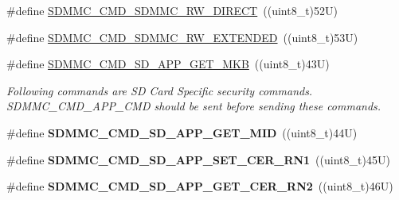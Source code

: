 \begin{DoxyCompactItemize}
\item 
\#define \mbox{\hyperlink{group___s_d_m_m_c___l_l___exported___constants_ga520defb88f2bc2fe1158ec87c6015164}{S\+D\+M\+M\+C\+\_\+\+C\+M\+D\+\_\+\+S\+D\+M\+M\+C\+\_\+\+R\+W\+\_\+\+D\+I\+R\+E\+CT}}~((uint8\+\_\+t)52\+U)
\item 
\#define \mbox{\hyperlink{group___s_d_m_m_c___l_l___exported___constants_ga585faee11fb2b1ab72216550b6c3ab83}{S\+D\+M\+M\+C\+\_\+\+C\+M\+D\+\_\+\+S\+D\+M\+M\+C\+\_\+\+R\+W\+\_\+\+E\+X\+T\+E\+N\+D\+ED}}~((uint8\+\_\+t)53\+U)
\item 
\mbox{\label{group___s_d_m_m_c___l_l___exported___constants_gac0070fb5ad86639410a4ad79c9da32b9}} 
\#define \mbox{\hyperlink{group___s_d_m_m_c___l_l___exported___constants_gac0070fb5ad86639410a4ad79c9da32b9}{S\+D\+M\+M\+C\+\_\+\+C\+M\+D\+\_\+\+S\+D\+\_\+\+A\+P\+P\+\_\+\+G\+E\+T\+\_\+\+M\+KB}}~((uint8\+\_\+t)43\+U)
\begin{DoxyCompactList}\small\item\em Following commands are SD Card Specific security commands. S\+D\+M\+M\+C\+\_\+\+C\+M\+D\+\_\+\+A\+P\+P\+\_\+\+C\+MD should be sent before sending these commands. \end{DoxyCompactList}\item 
\mbox{\label{group___s_d_m_m_c___l_l___exported___constants_gaa17f45a31366e47b44eff6e33982731e}} 
\#define {\bfseries S\+D\+M\+M\+C\+\_\+\+C\+M\+D\+\_\+\+S\+D\+\_\+\+A\+P\+P\+\_\+\+G\+E\+T\+\_\+\+M\+ID}~((uint8\+\_\+t)44\+U)
\item 
\mbox{\label{group___s_d_m_m_c___l_l___exported___constants_ga14ffceb4df0f9c9c67c678eb7d58bc4e}} 
\#define {\bfseries S\+D\+M\+M\+C\+\_\+\+C\+M\+D\+\_\+\+S\+D\+\_\+\+A\+P\+P\+\_\+\+S\+E\+T\+\_\+\+C\+E\+R\+\_\+\+R\+N1}~((uint8\+\_\+t)45\+U)
\item 
\mbox{\label{group___s_d_m_m_c___l_l___exported___constants_gaca35a469acc79c78813cc69fa8f3d89e}} 
\#define {\bfseries S\+D\+M\+M\+C\+\_\+\+C\+M\+D\+\_\+\+S\+D\+\_\+\+A\+P\+P\+\_\+\+G\+E\+T\+\_\+\+C\+E\+R\+\_\+\+R\+N2}~((uint8\+\_\+t)46\+U)
\item 
\mbox{\label{group___s_d_m_m_c___l_l___exported___constants_gadb781d85a8fd5a09f13596ad9295dcba}} 

\end{DoxyCompactItemize}
